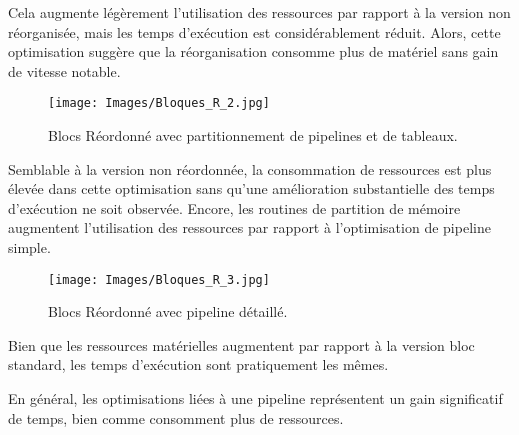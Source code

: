 \documentclass[../CSC_5RO06_TA.tex]{subfiles}
\begin{document}
Cela augmente légèrement l'utilisation des ressources par rapport à la version non réorganisée, mais les temps d'exécution est considérablement réduit. Alors, cette optimisation suggère que la réorganisation consomme plus de matériel sans gain de vitesse notable. 

\begin{figure}[H]
    \centering
    \texttt{[image: Images/Bloques\_R\_2.jpg]}
    \caption{Blocs Réordonné avec partitionnement de pipelines et de tableaux.}
    \label{fig:15}
\end{figure}

Semblable à la version non réordonnée, la consommation de ressources est plus élevée dans cette optimisation sans qu’une amélioration substantielle des temps d’exécution ne soit observée. Encore, les routines de partition de mémoire augmentent l'utilisation des ressources par rapport à l'optimisation de pipeline simple.

\begin{figure}[H]
    \centering
    \texttt{[image: Images/Bloques\_R\_3.jpg]}
    \caption{Blocs Réordonné avec pipeline détaillé.}
    \label{fig:16}
\end{figure}

Bien que les ressources matérielles augmentent par rapport à la version bloc standard, les temps d'exécution sont pratiquement les mêmes.

En général, les optimisations liées à une pipeline représentent un gain significatif de temps, bien comme consomment plus de ressources. 
\end{document}
